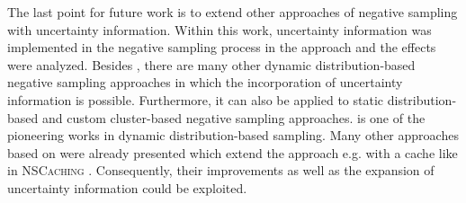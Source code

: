 The last point for future work is to extend other approaches of negative sampling with uncertainty information.
Within this work, uncertainty information was implemented in the negative sampling process in the \kbgan approach and the effects were analyzed.
Besides \kbgan, there are many other dynamic distribution-based negative sampling approaches in which the incorporation of uncertainty information is possible.
Furthermore, it can also be applied to static distribution-based and custom cluster-based negative sampling approaches.
\kbgan is one of the pioneering works in dynamic distribution-based sampling.
Many other approaches based on \kbgan were already presented which extend the approach e.g. with a cache like in \textsc{NSCaching} \cite{zhang2019nscaching}.
Consequently, their improvements as well as the expansion of uncertainty information could be exploited.
